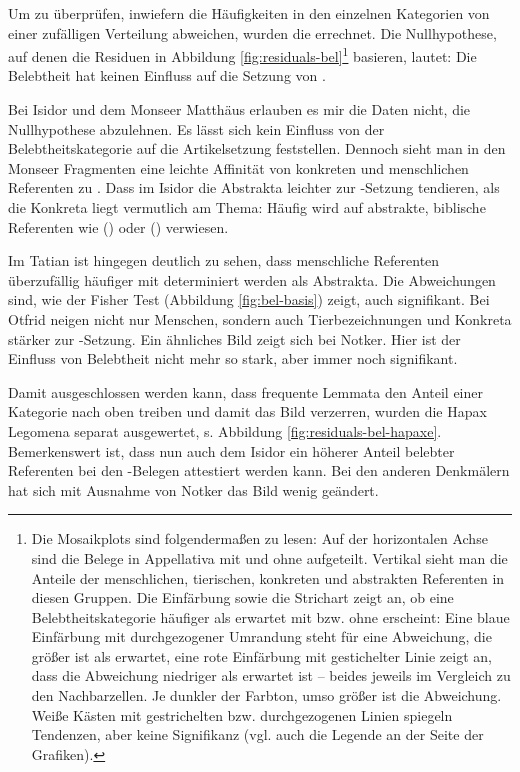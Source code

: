 Um zu überprüfen, inwiefern die Häufigkeiten in den einzelnen Kategorien von einer zufälligen Verteilung abweichen, wurden die  \parencite{Gries2013} errechnet. Die Nullhypothese, auf denen die Residuen in Abbildung \ref{fig:residuals-bel}\footnote{ 
Die Mosaikplots sind folgendermaßen zu lesen: Auf der horizontalen Achse sind die Belege in Appellativa mit und ohne  aufgeteilt. Vertikal sieht man die Anteile der menschlichen, tierischen, konkreten und abstrakten Referenten in diesen Gruppen. Die Einfärbung sowie die Strichart zeigt an, ob eine Belebtheitskategorie häufiger als erwartet mit bzw. ohne  erscheint: Eine blaue Einfärbung mit durchgezogener Umrandung steht für eine Abweichung, die größer ist als erwartet, eine rote Einfärbung mit gestichelter Linie zeigt an, dass die Abweichung niedriger als erwartet ist -- beides jeweils im Vergleich zu den Nachbarzellen. Je dunkler der Farbton, umso größer ist die Abweichung. Weiße Kästen mit gestrichelten bzw. durchgezogenen Linien spiegeln Tendenzen, aber keine Signifikanz (vgl. auch die Legende an der Seite der Grafiken).} basieren, lautet: Die Belebtheit hat keinen Einfluss auf die Setzung von . 

Bei Isidor und dem Monseer Matthäus erlauben es mir die Daten nicht, die Nullhypothese abzulehnen. Es lässt sich kein Einfluss von der Belebtheitskategorie auf die Artikelsetzung feststellen. Dennoch sieht man in den Monseer Fragmenten eine leichte Affinität von konkreten und menschlichen Referenten zu . Dass im Isidor die Abstrakta leichter zur -Setzung tendieren, als die Konkreta liegt vermutlich am Thema: Häufig wird auf abstrakte, biblische Referenten wie  () oder   () verwiesen.
 
Im Tatian ist hingegen deutlich zu sehen, dass menschliche Referenten überzufällig häufiger mit  determiniert werden als Abstrakta. Die Abweichungen sind, wie der Fisher Test (Abbildung \ref{fig:bel-basis}) zeigt, auch signifikant. Bei Otfrid neigen nicht nur Menschen, sondern auch  Tierbezeichnungen und Konkreta stärker zur -Setzung. Ein ähnliches Bild zeigt sich bei Notker. Hier ist der Einfluss von Belebtheit nicht mehr so stark, aber immer noch signifikant.    

Damit ausgeschlossen werden kann, dass frequente Lemmata den Anteil einer Kategorie nach oben treiben und damit das Bild verzerren, wurden die Hapax Legomena separat ausgewertet, s. Abbildung \ref{fig:residuals-bel-hapaxe}. Bemerkenswert ist, dass nun auch dem Isidor ein höherer Anteil belebter Referenten bei den -Belegen attestiert werden kann. Bei den anderen Denkmälern hat sich mit Ausnahme von Notker das Bild wenig geändert. 

